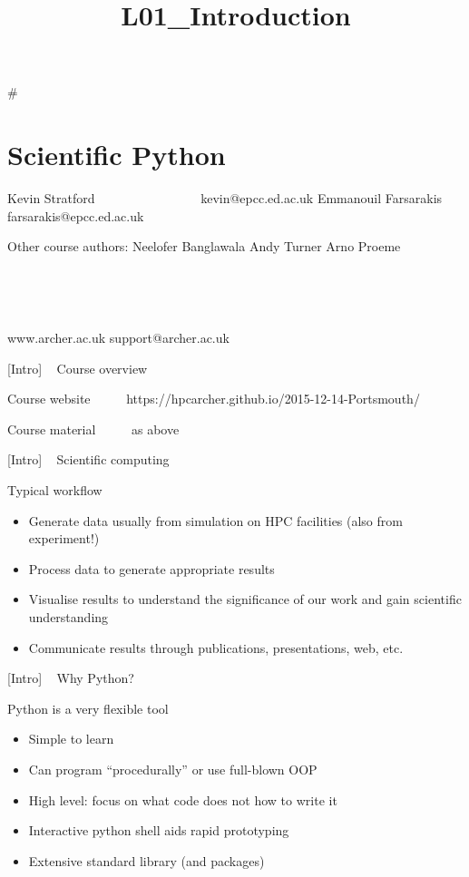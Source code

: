 \documentclass{article}
\title{L01\_Introduction}
\begin{document}
    
    
    \maketitle
    
    

    
    \#

\section{Scientific Python }\label{scientific-python}

Kevin Stratford ~ ~ ~ ~ ~ ~ ~ ~ ~ ~kevin@epcc.ed.ac.uk Emmanouil
Farsarakis ~ ~ farsarakis@epcc.ed.ac.uk

Other course authors: Neelofer Banglawala Andy Turner Arno Proeme 

    ~

    ~

www.archer.ac.uk support@archer.ac.uk

 

    {[}Intro{]} ~ Course overview

Course website ~ ~ ~ https://hpcarcher.github.io/2015-12-14-Portsmouth/

Course material ~ ~ ~ as above

    {[}Intro{]} ~ Scientific computing

Typical workflow

\begin{itemize}
\item
  Generate data usually from simulation on HPC facilities (also from
  experiment!)
\item
  Process data to generate appropriate results
\item
  Visualise results to understand the significance of our work and gain
  scientific understanding
\item
  Communicate results through publications, presentations, web, etc.
\end{itemize}

 

    {[}Intro{]} ~ Why Python?

Python is a very flexible tool

\begin{itemize}
\itemsep1pt\parskip0pt
\item
  Simple to learn
\item
  Can program ``procedurally'' or use full-blown OOP
\item
  High level: focus on what code does not how to write it
\item
  Interactive python shell aids rapid prototyping
\item
  Extensive standard library (and packages)
\end{itemize}
\end{document}
